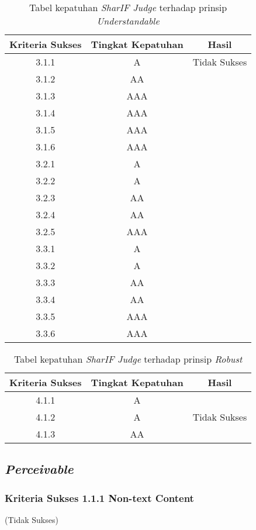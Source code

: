 \begin{table}[H]
	\centering
	\caption{Tabel kepatuhan \textit{SharIF Judge} terhadap prinsip \textit{Understandable}}
	\label{tab:kepatuhan_sharif_judge_understandable}
	\begin{tabular}{|c|c|c|}
		\hline
		Kriteria Sukses & Tingkat Kepatuhan & Hasil \\
		\hline
		3.1.1 & A & Tidak Sukses \\
		3.1.2 & AA & \\
		3.1.3 & AAA & \\
		3.1.4 & AAA & \\
		3.1.5 & AAA & \\
		3.1.6 & AAA & \\
		3.2.1 & A & \\
		3.2.2 & A & \\
		3.2.3 & AA & \\
		3.2.4 & AA & \\
		3.2.5 & AAA & \\
		3.3.1 & A & \\
		3.3.2 & A & \\
		3.3.3 & AA & \\
		3.3.4 & AA & \\
		3.3.5 & AAA & \\
		3.3.6 & AAA & \\
		\hline
	\end{tabular}
\end{table}

\begin{table}[H]
	\centering
	\caption{Tabel kepatuhan \textit{SharIF Judge} terhadap prinsip \textit{Robust}}
	\label{tab:kepatuhan_sharif_judge_robust}
	\begin{tabular}{|c|c|c|}
		\hline
		Kriteria Sukses & Tingkat Kepatuhan & Hasil \\
		\hline
		4.1.1 & A & \\
		4.1.2 & A & Tidak Sukses\\
		4.1.3 & AA & \\
		\hline
	\end{tabular}
\end{table}

\subsection{\textit{Perceivable}}
\label{subsec:kepatuhan_perceivable}

\subsubsection{Kriteria Sukses 1.1.1 Non-text Content}
\label{subsubsec:kepatuhan_kriteria_1.1.1}
(Tidak Sukses) \\

